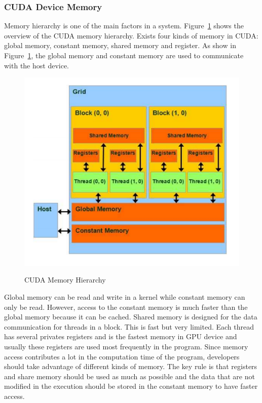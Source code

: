 \documentclass[Ingles]{ic-tese-v1}
\newcommand{\rfig}[1]{Figure~\ref{fig:#1}}
\begin{document}
\subsubsection{CUDA Device Memory}
\label{CUDA Device Memory}
Memory hierarchy is one of the main factors in a system. \rfig{cudamemory} shows the overview of the CUDA memory hierarchy. Exists four kinds of memory in CUDA: global
memory, constant memory, shared memory and register. As show in \rfig{cudamemory}, the global memory and constant memory are used to communicate with the host device.\\

\begin{figure}[t]
	\caption{CUDA Memory Hierarchy}
	\centering
	\includegraphics[scale=0.70]{images/cuda_memory.png}
	\label{fig:cudamemory}
\end{figure}

Global memory can be read and write in a kernel while constant memory can only be
read. However, access to the constant memory is much faster than the global memory because it can be cached. Shared memory is designed for the data communication for
threads in a block. This is fast but very limited. Each thread has several privates registers and is the fastest memory in GPU device and usually these registers are used  most frequently in the program. Since memory access contributes a lot in the computation time of the program, developers should take advantage of different kinds of memory. The key rule is that registers and share memory should be used as much as possible and the data that are not modified in the execution should be stored in the constant memory to have faster access.
\end{document}
